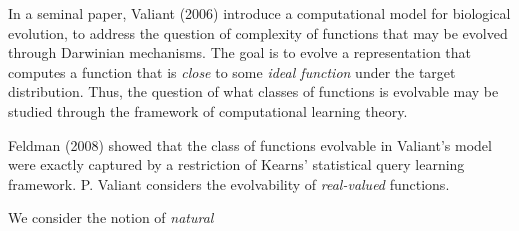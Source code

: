 In a seminal paper, Valiant (2006) introduce a computational model for
biological evolution, to address the question of complexity of functions that
may be evolved through Darwinian mechanisms. The goal is to evolve a
representation that computes a function that is \emph{close} to some \emph{ideal
function} under the target distribution. Thus, the question of what classes of
functions is evolvable may be studied through the framework of computational
learning theory.

Feldman (2008) showed that the class of functions evolvable in Valiant's model
were exactly captured by a restriction of Kearns' statistical query learning
framework. P. Valiant considers the evolvability of \emph{real-valued}
functions. 

We consider the notion of \emph{natural}
